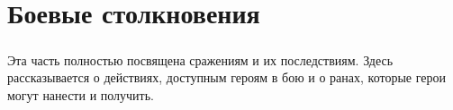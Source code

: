 \chapter{Боевые столкновения}
\paragraph{}
Эта часть полностью посвящена сражениям и их последствиям.
Здесь рассказывается о действиях, доступным героям в бою
и о ранах, которые герои могут нанести и получить.






